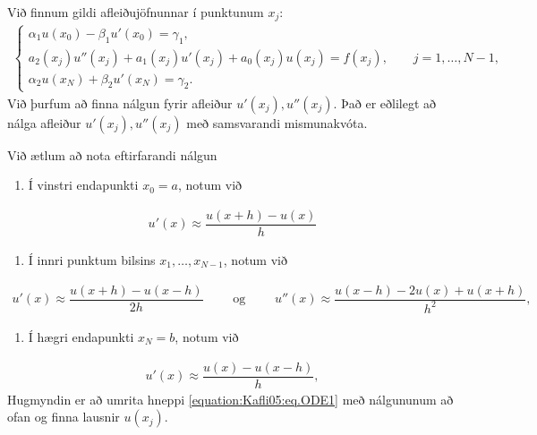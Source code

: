 \documentclass[a4paper,10pt,icelandic]{sphinxmanual}
\begin{document}
Við finnum gildi afleiðujöfnunnar í punktunum \(x_j\):
\begin{equation*}
\begin{split}\begin{cases}
\alpha_1u(x_0)-\beta_1u'(x_0)=\gamma_1,\\
a_2(x_j)u''(x_j)+a_1(x_j)u'(x_j)+a_0(x_j)u(x_j)=f(x_j), \qquad
j=1,\dots,N-1,\\
\alpha_2u(x_N)+\beta_2u'(x_N)=\gamma_2.
\end{cases}\end{split}
\end{equation*}
Við þurfum að finna nálgun fyrir afleiður \(u'(x_j),u''(x_j)\).
Það er eðlilegt að nálga afleiður \(u'(x_j),u''(x_j)\) með samsvarandi mismunakvóta.

Við ætlum að nota eftirfarandi nálgun
\begin{enumerate}
\def\theenumi{\arabic{enumi}}
\def\labelenumi{\theenumi .}
\makeatletter\def\p@enumii{\p@enumi \theenumi .}\makeatother
\item {} 
Í vinstri endapunkti \(x_0=a\), notum við

\end{enumerate}
\begin{equation*}
\begin{split}u'(x)\approx \dfrac{u(x+h)-u(x)}h\end{split}
\end{equation*}\begin{enumerate}
\def\theenumi{\arabic{enumi}}
\def\labelenumi{\theenumi .}
\makeatletter\def\p@enumii{\p@enumi \theenumi .}\makeatother
\setcounter{enumi}{1}
\item {} 
Í innri punktum bilsins \(x_1, \dots, x_{N-1}\), notum við

\end{enumerate}
\begin{equation}\label{equation:Kafli05:eq.approxder}
\begin{split}u'(x)\approx \dfrac{u(x+h)-u(x-h)}{2h} \qquad \text{ og } \qquad
u''(x)\approx \dfrac{u(x-h)-2u(x)+u(x+h)}{h^2},\end{split}
\end{equation}\begin{enumerate}
\def\theenumi{\arabic{enumi}}
\def\labelenumi{\theenumi .}
\makeatletter\def\p@enumii{\p@enumi \theenumi .}\makeatother
\setcounter{enumi}{2}
\item {} 
Í hægri endapunkti \(x_N=b\), notum við

\end{enumerate}
\begin{equation*}
\begin{split}u'(x)\approx \dfrac{u(x)-u(x-h)}h,\end{split}
\end{equation*}
Hugmyndin er að umrita hneppi \eqref{equation:Kafli05:eq.ODE1} með nálgununum að ofan og finna lausnir \(u(x_j)\).
\end{document}
